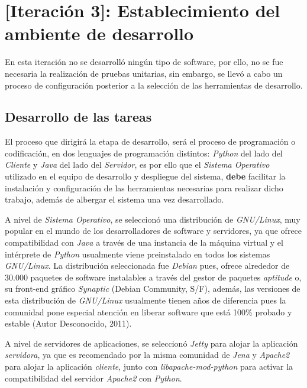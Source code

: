 \section{[Iteración 3]: Establecimiento del ambiente de desarrollo}
En esta iteración no se desarrolló ningún tipo de software, por ello, no se fue necesaria la realización de pruebas unitarias, sin embargo, se llevó a cabo un proceso de configuración posterior a la selección de las herramientas de desarrollo.

\subsection{Desarrollo de las tareas}
El proceso que dirigirá la etapa de desarrollo, será el proceso de programación o codificación, en dos lenguajes de programación distintos: \textit{Python} del lado del \textit{Cliente} y \textit{Java} del lado del \textit{Servidor}, es por ello que el \textit{Sistema Operativo} utilizado en el equipo de desarrollo y despliegue del sistema, \textbf{debe} facilitar la instalación y configuración de las herramientas necesarias para realizar dicho trabajo, además de albergar el sistema una vez desarrollado.

A nivel de \textit{Sistema Operativo}, se seleccionó una distribución de \textit{GNU/Linux}, muy popular en el mundo de los desarrolladores de software y servidores, ya que ofrece compatibilidad con \textit{Java} a través de una instancia de la máquina virtual y el intérprete de \textit{Python} usualmente viene preinstalado en todos los sistemas \textit{GNU/Linux}. La distribución seleccionada fue \textit{Debian} pues, ofrece alrededor de 30.000 paquetes de software instalables a través del gestor de paquetes \textit{aptitude} o, su front-end gráfico \textit{Synaptic} (Debian Community, S/F), además, las versiones de esta distribución de \textit{GNU/Linux} usualmente tienen años de diferencia pues la comunidad pone especial atención en liberar software que está 100\% probado y estable (Autor Desconocido, 2011).

A nivel de servidores de aplicaciones, se seleccionó \textit{Jetty} para alojar la aplicación \textit{servidora}, ya que es recomendado por la misma comunidad de \textit{Jena} y \textit{Apache2} para alojar la aplicación \textit{cliente}, junto con \textit{libapache-mod-python} para activar la compatibilidad del servidor \textit{Apache2} con \textit{Python}.

